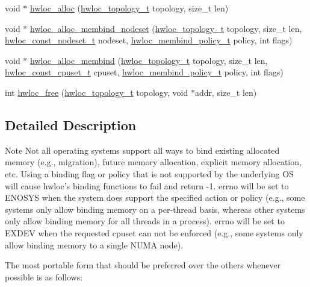 \begin{DoxyCompactItemize}
\item 
 void $\ast$ \hyperlink{a00050_gac5586e58cf25c3596b7d4aa31ce13259}{hwloc\_\-alloc} (\hyperlink{a00039_ga9d1e76ee15a7dee158b786c30b6a6e38}{hwloc\_\-topology\_\-t} topology, size\_\-t len)
\item 
 void $\ast$ \hyperlink{a00050_gaeaa00714a9c4319bda0a74ca6f8720e8}{hwloc\_\-alloc\_\-membind\_\-nodeset} (\hyperlink{a00039_ga9d1e76ee15a7dee158b786c30b6a6e38}{hwloc\_\-topology\_\-t} topology, size\_\-t len, \hyperlink{a00040_ga2f5276235841ad66a79bedad16a5a10c}{hwloc\_\-const\_\-nodeset\_\-t} nodeset, \hyperlink{a00050_gac9764f79505775d06407b40f5e4661e8}{hwloc\_\-membind\_\-policy\_\-t} policy, int flags) 
\item 
 void $\ast$ \hyperlink{a00050_ga221a7edc5d436300374fa16463f607e5}{hwloc\_\-alloc\_\-membind} (\hyperlink{a00039_ga9d1e76ee15a7dee158b786c30b6a6e38}{hwloc\_\-topology\_\-t} topology, size\_\-t len, \hyperlink{a00040_ga1f784433e9b606261f62d1134f6a3b25}{hwloc\_\-const\_\-cpuset\_\-t} cpuset, \hyperlink{a00050_gac9764f79505775d06407b40f5e4661e8}{hwloc\_\-membind\_\-policy\_\-t} policy, int flags) 
\item 
 int \hyperlink{a00050_ga986d9b4cc76da592c4b937c6cb7d9d56}{hwloc\_\-free} (\hyperlink{a00039_ga9d1e76ee15a7dee158b786c30b6a6e38}{hwloc\_\-topology\_\-t} topology, void $\ast$addr, size\_\-t len)
\end{DoxyCompactItemize}


\subsection{Detailed Description}
\begin{DoxyNote}{Note}
Not all operating systems support all ways to bind existing allocated memory (e.g., migration), future memory allocation, explicit memory allocation, etc. Using a binding flag or policy that is not supported by the underlying OS will cause hwloc's binding functions to fail and return -\/1. errno will be set to ENOSYS when the system does support the specified action or policy (e.g., some systems only allow binding memory on a per-\/thread basis, whereas other systems only allow binding memory for all threads in a process). errno will be set to EXDEV when the requested cpuset can not be enforced (e.g., some systems only allow binding memory to a single NUMA node).
\end{DoxyNote}
The most portable form that should be preferred over the others whenever possible is as follows:


